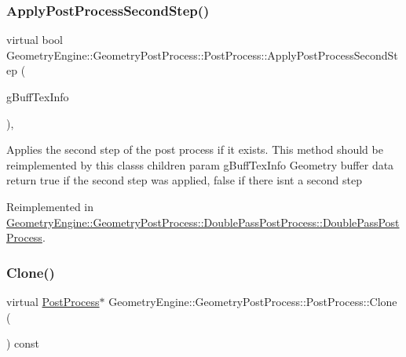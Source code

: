 \subsubsection{\texorpdfstring{ApplyPostProcessSecondStep()}{ApplyPostProcessSecondStep()}}
{\footnotesize\ttfamily virtual bool Geometry\+Engine\+::\+Geometry\+Post\+Process\+::\+Post\+Process\+::\+Apply\+Post\+Process\+Second\+Step (\begin{DoxyParamCaption}\item[{const \mbox{\hyperlink{class_geometry_engine_1_1_g_buffer_texture_info}{G\+Buffer\+Texture\+Info}} \&}]{g\+Buff\+Tex\+Info }\end{DoxyParamCaption})\hspace{0.3cm}{\ttfamily [inline]}, {\ttfamily [virtual]}}

Applies the second step of the post process if it exists. This method should be reimplemented by this class\textquotesingle{}s children param g\+Buff\+Tex\+Info Geometry buffer data return true if the second step was applied, false if there isn\textquotesingle{}t a second step 

Reimplemented in \mbox{\hyperlink{class_geometry_engine_1_1_geometry_post_process_1_1_double_pass_post_process_1_1_double_pass_post_process_a1caac8d2ec6f65de1bb98edd88ba14c6}{Geometry\+Engine\+::\+Geometry\+Post\+Process\+::\+Double\+Pass\+Post\+Process\+::\+Double\+Pass\+Post\+Process}}.

\mbox{\label{class_geometry_engine_1_1_geometry_post_process_1_1_post_process_aa80749cf09041335f6b3bda3aaf31711}} 
\subsubsection{\texorpdfstring{Clone()}{Clone()}}
{\footnotesize\ttfamily virtual \mbox{\hyperlink{class_geometry_engine_1_1_geometry_post_process_1_1_post_process}{Post\+Process}}$\ast$ Geometry\+Engine\+::\+Geometry\+Post\+Process\+::\+Post\+Process\+::\+Clone (\begin{DoxyParamCaption}{ }\end{DoxyParamCaption}) const\hspace{0.3cm}{\ttfamily [pure virtual]}}

